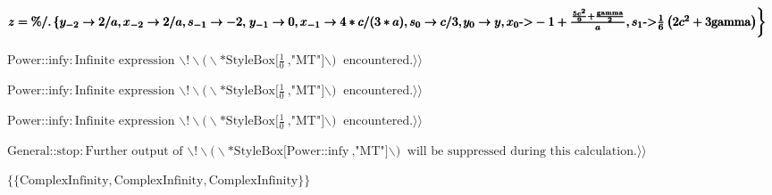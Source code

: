\documentclass{article}
\begin{document}
\noindent\(\pmb{z=\%\text{/.}\left\{y_{-2}\to 2/a,x_{-2}\to 2/a,s_{-1}\to -2,\right.}\\
\pmb{y_{-1}\to 0,x_{-1}\to 4*c/(3*a), s_0\to c/3,}\\
\pmb{\left.y_0\to y,x_0\text{-$>$}-1+\frac{\frac{5 c^2}{9}+\frac{\text{gamma}}{2}}{a},s_1\text{-$>$}\frac{1}{6} \left(2 c^2+3 \text{gamma}\right)\right\}}\)

\noindent\(\text{Power}\text{::}\text{infy}: \text{Infinite expression }\text{$\backslash $!$\backslash $($\backslash $*StyleBox[}\frac{1}{0}\text{,
$\texttt{"}$MT$\texttt{"}$]$\backslash $)}\text{ encountered.} \rangle\rangle \)

\noindent\(\text{Power}\text{::}\text{infy}: \text{Infinite expression }\text{$\backslash $!$\backslash $($\backslash $*StyleBox[}\frac{1}{0}\text{,
$\texttt{"}$MT$\texttt{"}$]$\backslash $)}\text{ encountered.} \rangle\rangle \)

\noindent\(\text{Power}\text{::}\text{infy}: \text{Infinite expression }\text{$\backslash $!$\backslash $($\backslash $*StyleBox[}\frac{1}{0}\text{,
$\texttt{"}$MT$\texttt{"}$]$\backslash $)}\text{ encountered.} \rangle\rangle \)

\noindent\(\text{General}\text{::}\text{stop}: \text{Further output of }\text{$\backslash $!$\backslash $($\backslash $*StyleBox[}\text{Power}\text{::}\text{infy}\text{,
$\texttt{"}$MT$\texttt{"}$]$\backslash $)}\text{ will be suppressed during this calculation.} \rangle\rangle \)

\noindent\(\{\{\text{ComplexInfinity},\text{ComplexInfinity},\text{ComplexInfinity}\}\}\)
\end{document}

